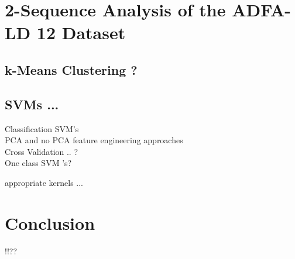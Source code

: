 \documentclass[reqno,openany,12pt]{amsbook}
\begin{document}
\chapter{2-Sequence Analysis of the ADFA-LD 12 Dataset}

\section{k-Means Clustering ?}

\section{SVMs ...}

Classification SVM's\\
PCA and no PCA feature engineering approaches\\
Cross Validation .. ?\\

One class SVM 's?

appropriate kernels ...

\chapter{Conclusion}


 !!?? 
 
 
 
\end{document}
